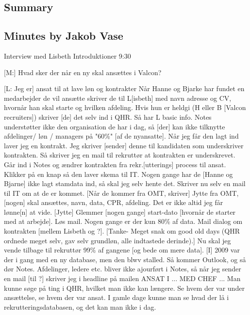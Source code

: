 \label{app:lisbeth}

\subsection{Summary}



\subsection{Minutes by Jakob Vase}

Interview med Lisbeth
Introduktioner
9:30

[M:] Hvad sker der når en ny skal ansættes i Valcon?

[L: Jeg er] ansat til at lave løn og kontrakter
Når Hanne og Bjarke har fundet en medarbejder de vil ansætte skriver de til L[isbeth] med navn adresse og CV, hvornår han skal starte og hvilken afdeling.
Hvis hun er heldgi (H eller B [Valcon recruiters]) skriver [de] det selv ind i QHR. Så har L basic info. Notes understøtter ikke den organisation de har i dag, så [der] kan ikke tilknytte afdelinger/ løn / managers på "60\%" [af de nyansatte]. Når jeg får den lagt ind laver jeg en kontrakt. Jeg skriver [sender] denne til kandidaten som underskriver kontrakten.
Så skriver jeg en mail til rekruttør at kontrakten er underskrevet. Går ind i Notes og ændrer kontrakten fra rekr.[utterings] process til ansat. Klikker på en knap så den laver skema til IT. Nogen gange har de [Hanne og Bjarne] ikke lagt stamdata ind, så skal jeg selv hente det.
Skriver nu selv en mail til IT om at de er kommet.
[Når de kommer fra OMT, skriver] Jytte fra OMT, [nogen] skal ansættes, navn, data, CPR, afdeling. Det er ikke altid jeg får lønne[n] at vide. [Jytte] Glemmer [nogen gange] start-dato [hvornår de starter med at arbejde]. Løs mail. Nogen gange er der kun 80\% af data.
Mail dialog om kontrakten [mellem Lisbeth og ?].
[Tanke- Meget snak om good old days (QHR ordnede meget selv, gav selv grundløn, alle indtastede derinde).]
Nu skal jeg vende tilbage til rekruttør 99\% af gangene [og bede om mere data].
[I] 2009 var der i gang med en ny database, men den blwv stalled. Så kommer Outlook, og så dør Notes. Afdelinger, ledere etc. bliver ikke ajourført i Notes, så når jeg sender en mail [til ?] skriver jeg i headline på mailen ANSAT I ... MED CHEF ...
Man kunne søge på ting i QHR, hvilket man ikke kan længere. Se hvem der var under ansættelse, se hvem der var ansat. I gamle dage kunne man se hvad der lå i rekrutteringsdatabasen, og det kan man ikke i dag.

